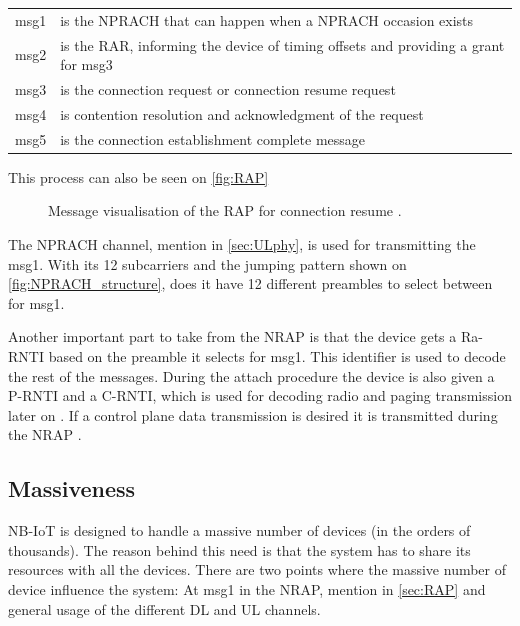 \begin{tabular}{ll}
msg1 & is the NPRACH that can happen when a NPRACH occasion exists \\
msg2 & is the \gls{RAR}, informing the device of timing offsets and providing a grant for msg3 \\
msg3 & is the connection request or connection resume request \\
msg4 & is contention resolution and acknowledgment of the request \\
msg5 & is the connection establishment complete message\\
\end{tabular}

This process can also be seen on \autoref{fig:RAP}


\begin{figure}[H]
\centering

\caption{Message visualisation of the \gls{RAP} for connection resume \citep{NB-IoT_Book}.}
\label{fig:RAP}
\end{figure}

The NPRACH channel, mention in \autoref{sec:ULphy}, is used for transmitting the msg1. With its 12 subcarriers and the jumping pattern shown on \autoref{fig:NPRACH_structure}, does it have 12 different preambles to select between for msg1.

Another important part to take from the \gls{NRAP} is that the device gets a \gls{Ra-RNTI} based on the preamble it selects for msg1. This identifier is used to decode the rest of the messages. During the attach procedure the device is also given a \gls{P-RNTI} and a \gls{C-RNTI}, which is used for decoding radio and paging transmission later on \citep{whitepaper}. If a control plane data transmission is desired it is transmitted during the \gls{NRAP} \citep{primer}.

\subsection{Massiveness}
NB-IoT is designed to handle a massive number of devices (in the orders of thousands). The reason behind this need is that the system has to share its resources with all the devices. There are two points where the massive number of device influence the system: At msg1 in the NRAP, mention in \autoref{sec:RAP} and general usage of the different DL and UL channels.

